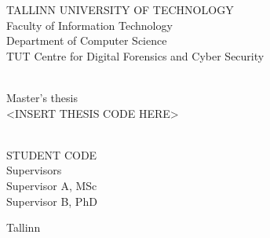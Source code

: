 \begin{titlepage}
\begingroup
    \singlespace
    \begin{center}
            TALLINN UNIVERSITY OF TECHNOLOGY \\
            Faculty of Information Technology \\
            Department of Computer Science \\
            TUT Centre for Digital Forensics and Cyber Security

        \vfill
            \huge \textbf{\MyTitle}\\[1cm]
            \large Master's thesis\\[1cm]
            <INSERT THESIS CODE HERE>\\[4cm]
            \normalsize

            \begin{flushright}
                \MyAuthor \\
                STUDENT CODE\\[1.5cm]
                Supervisors \\
                Supervisor A, MSc\\
                Supervisor B, PhD\\
            \end{flushright}
        \vfill

        Tallinn \MyDate
    \end{center}
\endgroup
\end{titlepage}
